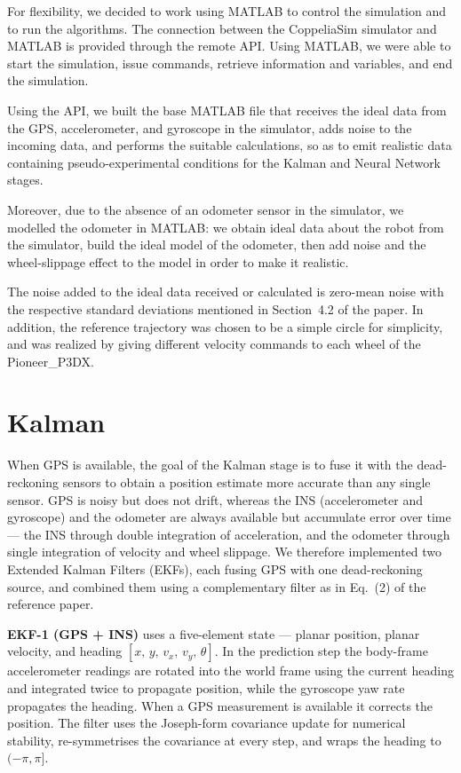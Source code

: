 \documentclass[11pt,a4paper]{article}
\begin{document}
For flexibility, we decided to work using MATLAB to control the simulation and to
run the algorithms. The connection between the CoppeliaSim simulator and MATLAB is
provided through the remote API. Using MATLAB, we were able to start the simulation,
issue commands, retrieve information and variables, and end the simulation.

Using the API, we built the base MATLAB file that receives the ideal data from the
GPS, accelerometer, and gyroscope in the simulator, adds noise to the incoming data,
and performs the suitable calculations, so as to emit realistic data containing
pseudo-experimental conditions for the Kalman and Neural Network stages.

Moreover, due to the absence of an odometer sensor in the simulator, we modelled the
odometer in MATLAB: we obtain ideal data about the robot from the simulator, build
the ideal model of the odometer, then add noise and the wheel-slippage effect to the
model in order to make it realistic.

The noise added to the ideal data received or calculated is zero-mean noise with the
respective standard deviations mentioned in Section~4.2 of the paper. In addition,
the reference trajectory was chosen to be a simple circle for simplicity, and was
realized by giving different velocity commands to each wheel of the Pioneer\_P3DX.

\section{Kalman}

When GPS is available, the goal of the Kalman stage is to fuse it with the
dead-reckoning sensors to obtain a position estimate more accurate than any single
sensor. GPS is noisy but does not drift, whereas the INS (accelerometer and
gyroscope) and the odometer are always available but accumulate error over time ---
the INS through double integration of acceleration, and the odometer through single
integration of velocity and wheel slippage. We therefore implemented two Extended
Kalman Filters (EKFs), each fusing GPS with one dead-reckoning source, and combined
them using a complementary filter as in Eq.~(2) of the reference paper.

\textbf{EKF-1 (GPS + INS)} uses a five-element state --- planar position, planar
velocity, and heading $[x,\,y,\,v_x,\,v_y,\,\theta]$. In the prediction step the
body-frame accelerometer readings are rotated into the world frame using the current
heading and integrated twice to propagate position, while the gyroscope yaw rate
propagates the heading. When a GPS measurement is available it corrects the position.
The filter uses the Joseph-form covariance update for numerical stability,
re-symmetrises the covariance at every step, and wraps the heading to $(-\pi,\pi]$.
\end{document}
